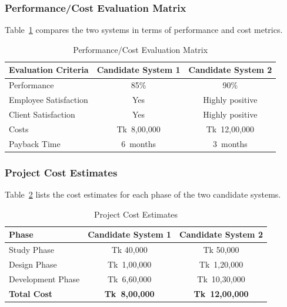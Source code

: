 \documentclass[12pt,a4paper]{article}
\begin{document}
\subsubsection{Performance/Cost Evaluation Matrix}
Table~\ref{tab:performance_cost} compares the two systems in terms of performance and cost metrics.

\begin{table}[H]
    \centering
    \renewcommand{\arraystretch}{1.3}
    \begin{tabular}{|p{4cm}|c|c|}
        \hline
        \textbf{Evaluation Criteria} & \textbf{Candidate System 1} & \textbf{Candidate System 2} \\
        \hline
        Performance & 85\% & 90\% \\
        \hline
        Employee Satisfaction & Yes & Highly positive \\
        \hline
        Client Satisfaction & Yes & Highly positive \\
        \hline
        Costs & Tk 8{,}00{,}000 & Tk 12{,}00{,}000 \\
        \hline
        Payback Time & 6 months & 3 months \\
        \hline
    \end{tabular}
    \caption{Performance/Cost Evaluation Matrix}
    \label{tab:performance_cost}
\end{table}

\newpage
\subsubsection{Project Cost Estimates}
Table~\ref{tab:cost_estimates} lists the cost estimates for each phase of the two candidate systems.

\begin{table}[H]
    \centering
    \renewcommand{\arraystretch}{1.3}
    \begin{tabular}{|p{3cm}|c|c|}
        \hline
        \textbf{Phase} & \textbf{Candidate System 1} & \textbf{Candidate System 2} \\
        \hline
        Study Phase & Tk 40{,}000 & Tk 50{,}000 \\
        \hline
        Design Phase & Tk 1{,}00{,}000 & Tk 1{,}20{,}000 \\
        \hline
        Development Phase & Tk 6{,}60{,}000 & Tk 10{,}30{,}000 \\
        \hline
        \textbf{Total Cost} & \textbf{Tk 8{,}00{,}000} & \textbf{Tk 12{,}00{,}000} \\
        \hline
    \end{tabular}
    \caption{Project Cost Estimates}
    \label{tab:cost_estimates}
\end{table}
\end{document}
